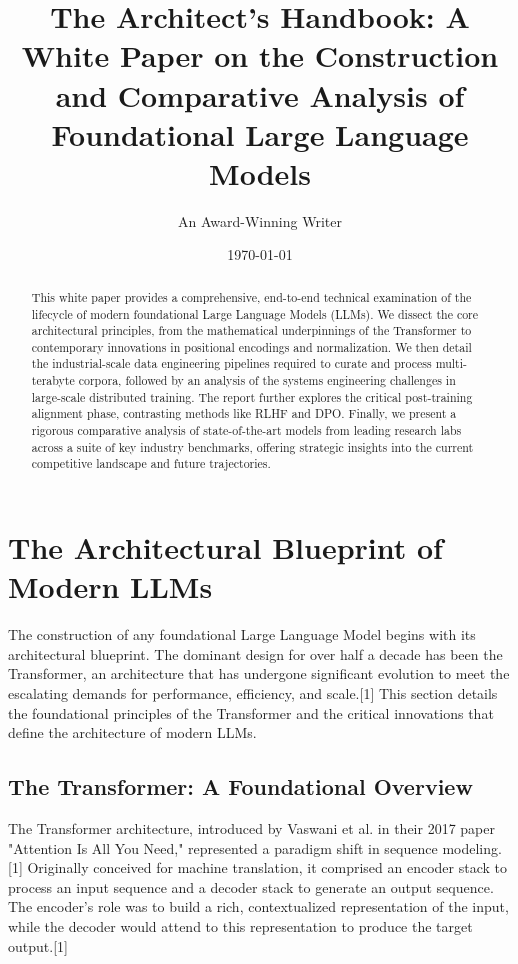 \documentclass[12pt, a4paper]{article}
\title{The Architect's Handbook: A White Paper on the Construction and Comparative Analysis of Foundational Large Language Models}
\author{An Award-Winning Writer}
\date{\today}
\begin{document}
\maketitle

\begin{abstract}
This white paper provides a comprehensive, end-to-end technical examination of the lifecycle of modern foundational Large Language Models (LLMs). We dissect the core architectural principles, from the mathematical underpinnings of the Transformer to contemporary innovations in positional encodings and normalization. We then detail the industrial-scale data engineering pipelines required to curate and process multi-terabyte corpora, followed by an analysis of the systems engineering challenges in large-scale distributed training. The report further explores the critical post-training alignment phase, contrasting methods like RLHF and DPO. Finally, we present a rigorous comparative analysis of state-of-the-art models from leading research labs across a suite of key industry benchmarks, offering strategic insights into the current competitive landscape and future trajectories.
\end{abstract}


\newpage

\section{The Architectural Blueprint of Modern LLMs}

The construction of any foundational Large Language Model begins with its architectural blueprint. The dominant design for over half a decade has been the Transformer, an architecture that has undergone significant evolution to meet the escalating demands for performance, efficiency, and scale.[1] This section details the foundational principles of the Transformer and the critical innovations that define the architecture of modern LLMs.

\subsection{The Transformer: A Foundational Overview}

The Transformer architecture, introduced by Vaswani et al. in their 2017 paper "Attention Is All You Need," represented a paradigm shift in sequence modeling.[1] Originally conceived for machine translation, it comprised an encoder stack to process an input sequence and a decoder stack to generate an output sequence. The encoder's role was to build a rich, contextualized representation of the input, while the decoder would attend to this representation to produce the target output.[1]
\end{document}
